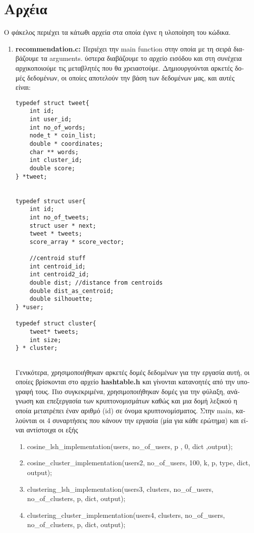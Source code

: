 \documentclass{article}
\begin{document}
\section{ \textgreek{Αρχέια}}
\textgreek{Ο φάκελος περιέχει τα κάτωθι αρχεία στα οποία έγινε η υλοποίηση του κώδικα.}
\begin{enumerate}
\item\textbf{ recommendation.c:} \textgreek{Περιέχει την} main function \textgreek{ στην οποία με τη σειρά διαβάζουμε τα }arguments. \textgreek{ύστερα διαβάζουμε το αρχείο εισόδου και στη συνέχεια αρχικοποιούμε τις μεταβλητές που θα χρειαστούμε.
Δημιουργούνται αρκετές δομές δεδομένων, οι οποίες αποτελούν την βάση των δεδομένων μας, και αυτές είναι:
}
\begin{verbatim}
typedef struct tweet{
	int id;
	int user_id;
	int no_of_words;
	node_t * coin_list;
	double * coordinates; 
	char ** words;  
	int cluster_id;
	double score;
} *tweet;


typedef struct user{
	int id;
	int no_of_tweets;
	struct user * next;
	tweet * tweets;
	score_array * score_vector;

	//centroid stuff
	int centroid_id;
	int centroid2_id;
	double dist; //distance from centroids
	double dist_as_centroid;
	double silhouette;
} *user;

typedef struct cluster{
	tweet* tweets;
	int size;
} * cluster;


\end{verbatim}

\textgreek{Γενικότερα, χρησιμοποιήθηκαν αρκετές δομές δεδομένων για την εργασία αυτή, οι οποίες βρίσκονται στο αρχείο }\textbf{hashtable.h} \textgreek{και γίνονται κατανοητές από την υπογραφή τους. Πιο συγκεκριμένα, χρησιμοποιήθηκαν δομές για την φύλαξη, ανάγνωση και επεξεργασία των κρυπτονομισμάτων καθώς και μια δομή λεξικού η οποία μετατρέπει έναν αριθμό} (id) \textgreek{σε όνομα κρυπτονομίσματος. Στην} main, \textgreek{καλούνται οι 4 συναρτήσεις που κάνουν την εργασία (μία για κάθε ερώτημα) και είναι αντίστοιχα οι εξής}
\begin{enumerate}
\item{ cosine\_lsh\_implementation(users, no\_of\_users, p , 0, dict ,output); }
\item{ cosine\_cluster\_implementation(users2, no\_of\_users, 100, k, p, type, dict, output);}
\item{ clustering\_lsh\_implementation(users3, clusters, no\_of\_users, no\_of\_clusters, p, dict, output);}
\item{ clustering\_cluster\_implementation(users4, clusters, no\_of\_users, no\_of\_clusters, p, dict, output);}


\end{enumerate}
\end{enumerate}
\end{document}
